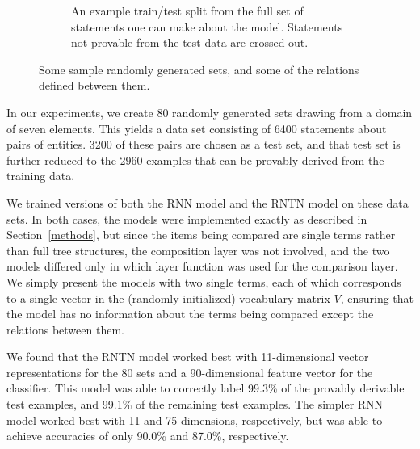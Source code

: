 \begin{figure}[htp]
\begin{subfigure}[t]{0.5\textwidth}
    \caption{An example train/test split from the full set
      of statements one can make about the model.
      Statements not provable from the test data are crossed out.}
  \end{subfigure}  
  \caption{Some sample randomly generated sets, and some of the relations defined between them.}
  \label{lattice-figure}
\end{figure} 


In our experiments, we create 80 randomly generated sets drawing from
a domain of seven elements. This yields a data set consisting of
6400 statements about pairs of entities. 3200 of these pairs are
chosen as a test set, and that test set is further reduced to the 2960
examples that can be provably derived from the training data.

We trained versions of both the RNN model and the RNTN model on these
data sets. In both cases, the models were implemented exactly as
described in Section~\ref{methods}, but since the items being compared
are single terms rather than full tree structures, the composition
layer was not involved, and the two models differed only in which
layer function was used for the comparison layer. We simply present
the models with two single terms, each of which corresponds to a
single vector in the (randomly initialized) vocabulary matrix $V$,
ensuring that the model has no information about the terms being
compared except the relations between them. 

We found that the RNTN model worked best with 11-dimensional vector representations for the
80 sets and a 90-dimensional feature vector for the classifier. This
model was able to correctly label 99.3\% of the provably derivable test
examples, and 99.1\% of the remaining test examples. The simpler RNN model
worked best with 11 and 75 dimensions, respectively, but was able to
achieve accuracies of only 90.0\% and 87.0\%, respectively.

